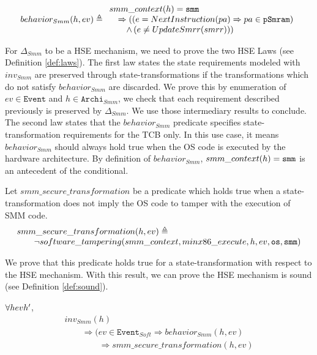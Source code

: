 \[
  behavior_{Smm}(h, ev) \triangleq \begin{array}{l}
    smm\_context(h) = \mathtt{smm} \\
                                   \quad \Rightarrow ((e = NextInstruction(pa)
                                   \Rightarrow pa \in \texttt{pSmram}) \\
                                   \qquad \wedge\,(e \neq UpdateSmrr(smrr))) \\
                                 \end{array}
  \]

For $\Delta_{Smm}$ to be a HSE mechanism, we need to prove the two HSE Laws (see
Definition \ref{def:laws}).  The first law states the state requirements modeled
with $inv_{Smm}$ are preserved through state-transformations if the
transformations which do not satisfy $behavior_{Smm}$ are discarded. We prove
this by enumeration of $ev \in \texttt{Event}$ and $h \in \texttt{Archi}_{Smm}$,
we check that each requirement described previously is preserved by
$\Delta_{Smm}$. We use those intermediary results to conclude. The second law
states that the $behavior_{Smm}$ predicate specifies state-trans\-formation
requirements for the TCB only. In this use case, it means $behavior_{Smm}$
should always hold true when the OS code is executed by the hardware
architecture.  By definition of $behavior_{Smm}$, $smm\_context(h) = \mathtt{smm}$
is an antecedent of the conditional.

Let $smm\_secure\_transformation$ be a predicate which holds true when a
state-transformation does not imply the OS code to tamper with the execution of
SMM code.
\[ \begin{array}{l}
    smm\_secure\_transformation(h, ev) \triangleq \\
    \qquad \neg software\_tampering(smm\_context, minx86\_execute, h, ev,
                  \mathtt{os}, \mathtt{smm})
\end{array} \]

We prove that this predicate holds true for a state-transformation with respect
to the HSE mechanism. With this result, we can prove the HSE mechanism is sound
(see Definition \ref{def:sound}).

\begin{lemma}
$\forall \transitionLTS{Smmx86}{h}{ev}{h'}$,
\[ \begin{array}{l}
    inv_{Smm}(h) \\
    \qquad \Rightarrow (ev \in \texttt{Event}_{Soft} \Rightarrow
    behavior_{Smm}(h,ev) \\
  \qquad\qquad \Rightarrow smm\_secure\_transformation(h, ev)
\end{array} \]
\end{lemma}

